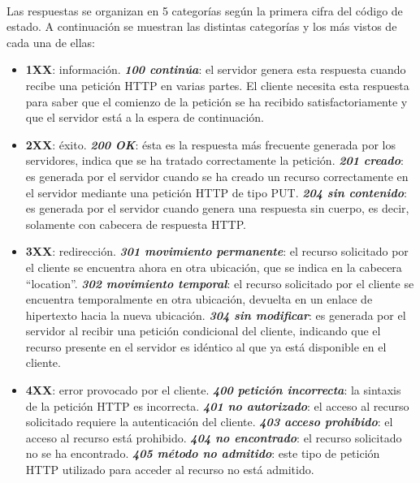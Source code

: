 \documentclass{article}
\begin{document}
	\paragraph{}Las respuestas se organizan en 5 categorías según la primera cifra del código de estado. A continuación se muestran las distintas categorías y los más vistos de cada una de ellas:
	\begin{itemize}
		\item \textbf{1XX}: información.
			\subitem \textbf{\textit{100 continúa}}: el servidor genera esta respuesta cuando recibe una petición HTTP en varias partes. El cliente necesita esta respuesta para saber que el comienzo de la petición se ha recibido satisfactoriamente y que el servidor está a la espera de continuación.
		\item \textbf{2XX}: éxito.
			\subitem \textbf{\textit{200 OK}}: ésta es la respuesta más frecuente generada por los servidores, indica que se ha tratado correctamente la petición.
			\subitem \textbf{\textit{201 creado}}: es generada por el servidor cuando se ha creado un recurso correctamente en el servidor mediante una petición HTTP de tipo PUT.
			\subitem \textbf{\textit{204 sin contenido}}: es generada por el servidor cuando genera una respuesta sin cuerpo, es decir, solamente con cabecera de respuesta HTTP.
		 \item \textbf{3XX}: redirección.
		 	\subitem \textbf{\textit{301 movimiento permanente}}: el recurso solicitado por el cliente se encuentra ahora en otra ubicación, que se indica en la cabecera ``location''.
		 	\subitem \textbf{\textit{302 movimiento temporal}}: el recurso solicitado por el cliente se encuentra temporalmente en otra ubicación, devuelta en un enlace de hipertexto hacia la nueva ubicación.
		 	\subitem \textbf{\textit{304 sin modificar}}: es generada por el servidor al recibir una petición condicional del cliente, indicando que el recurso presente en el servidor es idéntico al que ya está disponible en el cliente.
		 \item \textbf{4XX}: error provocado por el cliente.
		 	\subitem \textbf{\textit{400 petición incorrecta}}: la sintaxis de la petición HTTP es incorrecta.
		 	\subitem \textbf{\textit{401 no autorizado}}: el acceso al recurso solicitado requiere la autenticación del cliente.
		 	\subitem \textbf{\textit{403 acceso prohibido}}: el acceso al recurso está prohibido.
		 	\subitem\textbf{\textit{404 no encontrado}}: el recurso solicitado no se ha encontrado.
		 	\subitem \textbf{\textit{405 método no admitido}}: este tipo de petición HTTP utilizado para acceder al recurso no está admitido.

\end{itemize}
\end{document}
